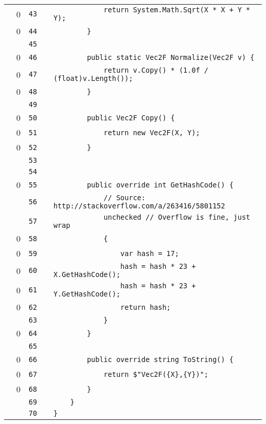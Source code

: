\documentclass[a4paper,landscape,10pt]{article}
\begin{document}
\begin{longtable}[l]{lrrll}
\cellcolor{red} & 0 & \verb~43~ & & \verb~            return System.Math.Sqrt(X * X + Y * Y);~\\
\cellcolor{red} & 0 & \verb~44~ & & \verb~        }~\\
\cellcolor{gray} &  & \verb~45~ & & \verb~~\\
\cellcolor{red} & 0 & \verb~46~ & & \verb~        public static Vec2F Normalize(Vec2F v) {~\\
\cellcolor{red} & 0 & \verb~47~ & & \verb~            return v.Copy() * (1.0f / (float)v.Length());~\\
\cellcolor{red} & 0 & \verb~48~ & & \verb~        }~\\
\cellcolor{gray} &  & \verb~49~ & & \verb~~\\
\cellcolor{red} & 0 & \verb~50~ & & \verb~        public Vec2F Copy() {~\\
\cellcolor{red} & 0 & \verb~51~ & & \verb~            return new Vec2F(X, Y);~\\
\cellcolor{red} & 0 & \verb~52~ & & \verb~        }~\\
\cellcolor{gray} &  & \verb~53~ & & \verb~~\\
\cellcolor{gray} &  & \verb~54~ & & \verb~~\\
\cellcolor{red} & 0 & \verb~55~ & & \verb~        public override int GetHashCode() {~\\
\cellcolor{gray} &  & \verb~56~ & & \verb~            // Source: http://stackoverflow.com/a/263416/5801152~\\
\cellcolor{gray} &  & \verb~57~ & & \verb~            unchecked // Overflow is fine, just wrap~\\
\cellcolor{red} & 0 & \verb~58~ & & \verb~            {~\\
\cellcolor{red} & 0 & \verb~59~ & & \verb~                var hash = 17;~\\
\cellcolor{red} & 0 & \verb~60~ & & \verb~                hash = hash * 23 + X.GetHashCode();~\\
\cellcolor{red} & 0 & \verb~61~ & & \verb~                hash = hash * 23 + Y.GetHashCode();~\\
\cellcolor{red} & 0 & \verb~62~ & & \verb~                return hash;~\\
\cellcolor{gray} &  & \verb~63~ & & \verb~            }~\\
\cellcolor{red} & 0 & \verb~64~ & & \verb~        }~\\
\cellcolor{gray} &  & \verb~65~ & & \verb~~\\
\cellcolor{red} & 0 & \verb~66~ & & \verb~        public override string ToString() {~\\
\cellcolor{red} & 0 & \verb~67~ & & \verb~            return $"Vec2F({X},{Y})";~\\
\cellcolor{red} & 0 & \verb~68~ & & \verb~        }~\\
\cellcolor{gray} &  & \verb~69~ & & \verb~    }~\\
\cellcolor{gray} &  & \verb~70~ & & \verb~}~\\
\end{longtable}
\newpage
\end{document}
